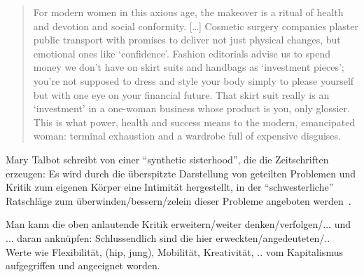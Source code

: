 \begin{quote}
For modern women in this axious age, the makeover is a ritual of health and devotion and social conformity.
[\ldots]
Cosmetic surgery companies plaster public transport with promises to deliver not just physical changes, but emotional ones like `confidence'.
Fashion editorials advise us to spend money we don't have on skirt suits and handbags as `investment pieces'; you're not supposed to dress and style your body simply to please yourself but with one eye on your financial future.
That skirt suit really is an `investment' in a one-woman business whose product is you, only glossier.
This is what power, health and success means to the modern, emancipated woman: terminal exhaustion and a wardrobe full of expensive disguises.~\cite[p.41-42]{Penny14}
\end{quote}

Mary Talbot schreibt von einer ``synthetic sisterhood'', die die Zeitschriften erzeugen:
Es wird durch die überspitzte Darstellung von geteilten Problemen und Kritik zum eigenen Körper eine Intimität hergestellt, in der ``schwesterliche'' Ratschläge zum überwinden/bessern/zelein dieser Probleme angeboten werden~\cite{Talbot95}.


Man kann die oben anlautende Kritik erweitern/weiter denken/verfolgen/... und ... daran anknüpfen:
Schlussendlich sind die hier erweckten/angedeuteten/.. Werte wie Flexibilität, (hip, jung), Mobilität, Kreativität, .. vom Kapitalismus aufgegriffen und angeeignet worden.




\begin{comment}
Eine weitere spannende Kategorie habe ich ``one night stand'' bzw Sachen, die mit Sex zu tun haben benannt.
Wir kennen den platten Ausdruck ``sex sells'' und die kapitalistische Gesellschaft tut Frauen gnadenlos als sexualisierte Objekte ausbeuten (besser ausführen, nach Kapitalismuskritik).
Warum aber werden Wörter und Ausdrücke aus diesem semantischen Feld auf Englisch gebraucht?
Ich würde hier wieder das Argument mit der Prestige, bzw coolness heranziehen. (vgl auch Laurie Penny!)
\end{comment}


\begin{comment}
Eckert:

``Once the agent isolates and attributes significance to a feature, that feautre becomes a resource that he or she can incorporate or not into his or her own style.''
--> Switching is identified as a resource by the publishers of the magazine

1st order indexicality/Indizes
Latinas

2nd order
bewusste Nutzung von bilingualen Codes von den Herausgeberinnen um sich als Latinas zu positionieren und diese anzusprechen; eine Sisterhood zu simulieren

3rd order
social mobility/prestige?
\end{comment}


